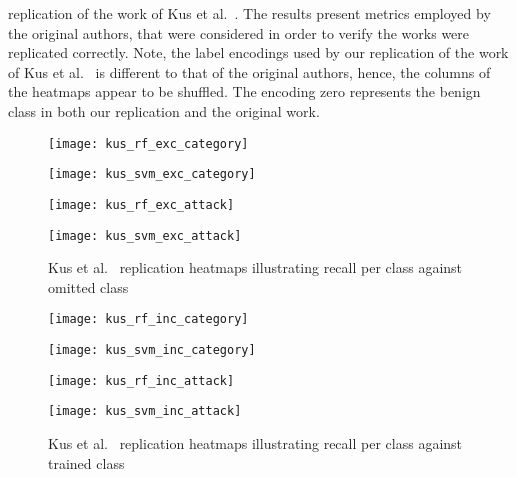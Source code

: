 replication of the work of Kus et al.~\cite{Kus}. The results present metrics
employed by the original authors, that were considered in order to verify the
works were replicated correctly. Note, the label encodings used by our
replication of the work of Kus et al.~\cite{Kus} is different to that of the
original authors, hence, the columns of the heatmaps appear to be shuffled. The
encoding zero represents the benign class in both our replication and the
original work.
%
\begin{figure}[htbp]
    \centering
    \begin{minipage}[h]{0.5\textwidth}
        \centering
        \texttt{[image: kus\_rf\_exc\_category]}
    \end{minipage}\hfill
    \begin{minipage}[h]{0.5\textwidth}
        \centering
        \texttt{[image: kus\_svm\_exc\_category]}
    \end{minipage}
    \begin{minipage}[h]{0.5\textwidth}
        \centering
        \texttt{[image: kus\_rf\_exc\_attack]}
    \end{minipage}\hfill
    \begin{minipage}[h]{0.5\textwidth}
        \centering
        \texttt{[image: kus\_svm\_exc\_attack]}
    \end{minipage}
    \caption[Kus et al.~\cite{Kus} Replication Class Omission Heatmaps]{Kus et al.~\cite{Kus} replication heatmaps illustrating recall per class against omitted class\label{fig:kus_rep_exc}}
\end{figure}

\begin{figure}[htbp]
    \centering
    \begin{minipage}[h]{0.5\textwidth}
        \centering
        \texttt{[image: kus\_rf\_inc\_category]}
    \end{minipage}\hfill
    \begin{minipage}[h]{0.5\textwidth}
        \centering
        \texttt{[image: kus\_svm\_inc\_category]}
    \end{minipage}
    \begin{minipage}[h]{0.5\textwidth}
        \centering
        \texttt{[image: kus\_rf\_inc\_attack]}
    \end{minipage}\hfill
    \begin{minipage}[h]{0.5\textwidth}
        \centering
        \texttt{[image: kus\_svm\_inc\_attack]}
    \end{minipage}
    \caption[Kus et al.~\cite{Kus} Replication Single Class Heatmaps]{Kus et al.~\cite{Kus} replication heatmaps illustrating recall per class against trained class\label{fig:kus_rep_inc}}
\end{figure}
% 

